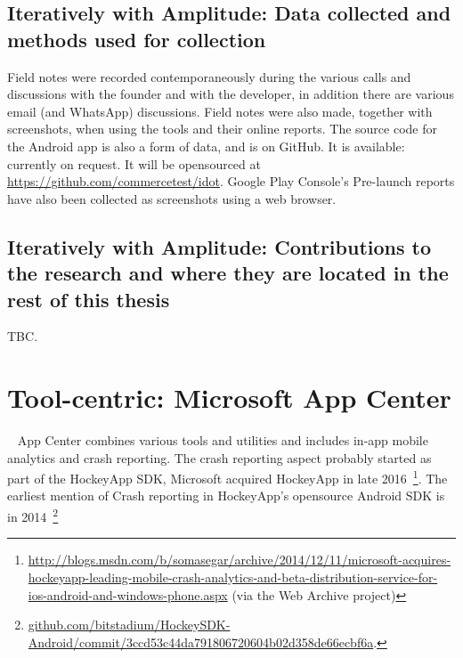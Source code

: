 \subsection{Iteratively with Amplitude: Data collected and methods used for collection}
Field notes were recorded contemporaneously during the various calls and discussions with the founder and with the developer, in addition there are various email (and WhatsApp) discussions. Field notes were also made, together with screenshots, when using the tools and their online reports. The source code for the Android app is also a form of data, and is on GitHub. It is available: currently on request. It will be opensourced at \url{https://github.com/commercetest/idot}. Google Play Console's Pre-launch reports have also been collected as screenshots using a web browser.

\subsection{Iteratively with Amplitude: Contributions to the research and where they are located in the rest of this thesis}
TBC.


\clearpage


\section{Tool-centric: Microsoft App Center}~\label{case-study-overview-microsoft-app-center}
App Center combines various tools and utilities and includes in-app mobile analytics and crash reporting. The crash reporting aspect probably started as part of the HockeyApp SDK, Microsoft acquired HockeyApp in late 2016~\footnote{\href{https://web.archive.org/web/20150702124106/http://blogs.msdn.com/b/somasegar/archive/2014/12/11/microsoft-acquires-hockeyapp-leading-mobile-crash-analytics-and-beta-distribution-service-for-ios-android-and-windows-phone.aspx}{http://blogs.msdn.com/b/somasegar/archive/2014/12/11/microsoft-acquires-hockeyapp-leading-mobile-crash-analytics-and-beta-distribution-service-for-ios-android-and-windows-phone.aspx} (via the Web Archive project)}. The earliest mention of Crash reporting in HockeyApp's opensource Android SDK is in 2014~\footnote{\href{https://github.com/bitstadium/HockeySDK-Android/commit/3ccd53c44da791806720604b02d358de66ecbf6a}{github.com/bitstadium/HockeySDK-Android/commit/3ccd53c44da791806720604b02d358de66ecbf6a}.}


